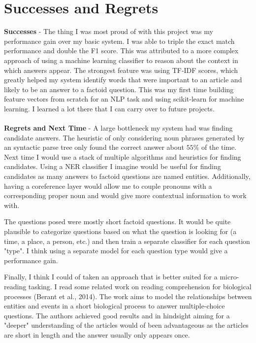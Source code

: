 \documentclass[a4paper, 11pt]{article} %
\begin{document}
\section*{Successes and Regrets}

\textbf{Successes} - The thing I was most proud of with this project was my performance gain over my basic system. I was able to triple the exact match performance and double the F1 score. This was attributed to a more complex approach of using a machine learning classifier to reason about the context in which answers appear. The strongest feature was using TF-IDF scores, which greatly helped my system identify words that were important to an article and likely to be an answer to a factoid question. This was my first time building feature vectors from scratch for an NLP task and using scikit-learn for machine learning. I learned a lot there that I can carry over to future projects.
\\~\\
\textbf{Regrets and Next Time} - A large bottleneck my system had was finding candidate answers. The heuristic of only considering noun phrases generated by an syntactic parse tree only found the correct answer about $55\%$ of the time. Next time I would use a stack of multiple algorithms and heuristics for finding candidates. Using a NER classifier I imagine would be useful for finding candidates as many answers to factoid questions are named entities. Additionally, having a coreference layer would allow me to couple pronouns with a corresponding proper noun and would give more contextual information to work with.

The questions posed were mostly short factoid questions. It would be quite plausible to categorize questions based on what the question is looking for (a time, a place, a person, etc.) and then train a separate classifier for each question "type". I think using a separate model for each question type would give a performance gain.

Finally, I think I could of taken an approach that is better suited for a micro-reading tasking. I read some related work on reading comprehension for biological processes (Berant et al., 2014). The work aims to model the relationships between entities and events in a short biological process to answer multiple-choice questions. The authors achieved good results and in hindsight aiming for a "deeper" understanding of the articles would of been advantageous as the articles are short in length and the answer usually only appears once.
\end{document}
